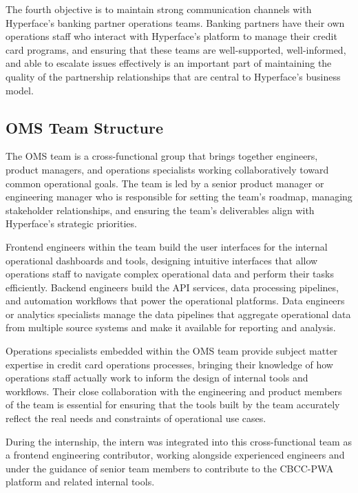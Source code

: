 The fourth objective is to maintain strong communication channels with Hyperface's banking partner operations teams. Banking partners have their own operations staff who interact with Hyperface's platform to manage their credit card programs, and ensuring that these teams are well-supported, well-informed, and able to escalate issues effectively is an important part of maintaining the quality of the partnership relationships that are central to Hyperface's business model.

\subsection{OMS Team Structure}

The OMS team is a cross-functional group that brings together engineers, product managers, and operations specialists working collaboratively toward common operational goals. The team is led by a senior product manager or engineering manager who is responsible for setting the team's roadmap, managing stakeholder relationships, and ensuring the team's deliverables align with Hyperface's strategic priorities.

Frontend engineers within the team build the user interfaces for the internal operational dashboards and tools, designing intuitive interfaces that allow operations staff to navigate complex operational data and perform their tasks efficiently. Backend engineers build the API services, data processing pipelines, and automation workflows that power the operational platforms. Data engineers or analytics specialists manage the data pipelines that aggregate operational data from multiple source systems and make it available for reporting and analysis.

Operations specialists embedded within the OMS team provide subject matter expertise in credit card operations processes, bringing their knowledge of how operations staff actually work to inform the design of internal tools and workflows. Their close collaboration with the engineering and product members of the team is essential for ensuring that the tools built by the team accurately reflect the real needs and constraints of operational use cases.

During the internship, the intern was integrated into this cross-functional team as a frontend engineering contributor, working alongside experienced engineers and under the guidance of senior team members to contribute to the CBCC-PWA platform and related internal tools.

